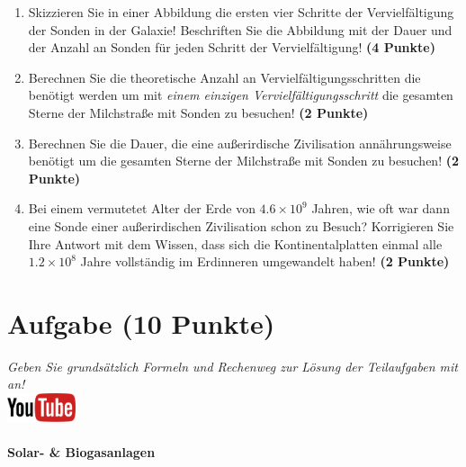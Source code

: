 \documentclass[a4paper, 9pt]{scrartcl}\usepackage[]{graphicx}\usepackage[]{xcolor}
\begin{document}
\begin{enumerate}
\item Skizzieren Sie in einer Abbildung die ersten vier Schritte der
  Vervielf{\"a}ltigung der Sonden in der Galaxie! Beschriften Sie die Abbildung
  mit der Dauer und der Anzahl an Sonden f{\"u}r jeden Schritt der Vervielf{\"a}ltigung! \textbf{(4 Punkte)}
\item Berechnen Sie die theoretische Anzahl an Vervielf{\"a}ltigungsschritten die
  ben{\"o}tigt werden um mit \textit{einem einzigen Vervielf{\"a}ltigungsschritt} die
  gesamten Sterne der Milchstra{\ss}e mit Sonden zu besuchen! \textbf{(2 Punkte)}
\item Berechnen Sie die Dauer, die eine au{\ss}erirdische Zivilisation
  ann{\"a}hrungsweise ben{\"o}tigt um die gesamten Sterne der Milchstra{\ss}e mit
  Sonden zu besuchen! \textbf{(2 Punkte)}
\item Bei einem vermutetet Alter der Erde von $\ensuremath{4.6\times 10^{9}}$ Jahren,
  wie oft war dann eine Sonde einer au{\ss}erirdischen Zivilisation schon zu
  Besuch? Korrigieren Sie Ihre Antwort mit dem Wissen, dass sich die
  Kontinentalplatten einmal alle $\ensuremath{1.2\times 10^{8}}$ Jahre vollst{\"a}ndig im
  Erdinneren umgewandelt haben! \textbf{(2 Punkte)}
\end{enumerate}


 
\clearpage

\section{Aufgabe \hfill (10 Punkte)}

\textit{Geben Sie grunds{\"a}tzlich Formeln und Rechenweg zur L{\"o}sung der
  Teilaufgaben mit an!} \\[1Ex]

\hfill\href{https://youtu.be/aBxLkdF-c4M}{\includegraphics[width =
  2cm]{img/youtube}} %
\hspace{2Ex}

\paragraph{Solar- \& Biogasanlagen}
\end{document}
